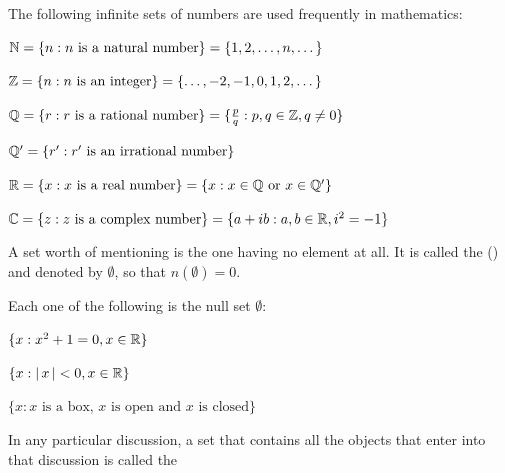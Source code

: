 \documentclass[11pt]{amsbook}
\begin{document}
\begin{exmp} 
	The following infinite sets of numbers are used frequently in mathematics:
	
	\begin{hEnumerateArabic}	 
		\item
		$ \mathbb{N} = \{ n : n \text{ is a natural number} \} = \{ 1, 2, \dotsc, n, \dotsc \} $
		
		\item
		$ \mathbb{Z} = \{ n : n \text{ is an integer} \} = \{ \dotsc, -2, -1, 0, 1, 2, \dotsc \} $
		
		\item
		$ \mathbb{Q} = \{ r : r \text{ is a rational number} \} = \{ \frac{p}{q} : p, q \in \mathbb{Z}, q \neq 0 \} $
		
		\item
		$ \mathbb{Q}'= \{ r' : r' \text{ is an irrational number} \} $

		\item
		$ \mathbb{R} = \{ x : x \text{ is a real number} \} = \{ x : x \in \mathbb{Q} \text{ or } x \in \mathbb{Q}' \} $
		
		\item
		$ \mathbb{C} = \{ z : z \text{ is a complex number} \} = \{ a + ib : a, b \in \mathbb{R}, i^{2} = -1 \} $	 
	\end{hEnumerateArabic} 
\end{exmp}


A set worth of mentioning is the one having no element at all. 
It is called the  () and denoted by
$ \emptyset $,
so that
$ n(\emptyset) = 0 $.


\begin{exmp} 
	Each one of the following is the null set
	$ \emptyset $:
	
	\begin{hEnumerateArabic}	
		\item
		$ \{ x : x^{2} + 1 = 0 , x \in \mathbb{R} \} $

		\item
		$ \{ x : \left \lvert \, x \, \right \rvert < 0 , x \in \mathbb{R} \} $

		\item
		$ \{ x : x \text{ is a box, } x \text{ is open and } x \text{ is closed} \} $
	\end{hEnumerateArabic} 
\end{exmp}


In any particular discussion, a set that contains all the objects that enter into that discussion is called the 
\end{document}
